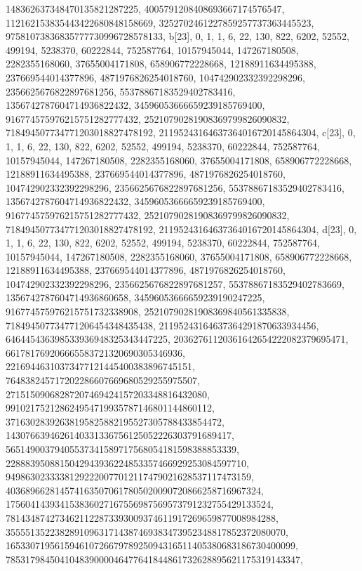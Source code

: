{{{   148362637348470135821287225, 4005791208408693667174576547, 
   112162153835443422680848158669, 3252702461227859257737363445523, 
   97581073836835777730996728578133}}, 
 {b[23], {0, 1, 1, 6, 22, 130, 822, 6202, 52552, 499194, 5238370, 60222844, 
   752587764, 10157945044, 147267180508, 2282355168060, 37655004171808, 
   658906772228668, 12188911634495388, 237669544014377896, 
   4871976826254018760, 104742902332392298296, 2356625676822897681256, 
   55378867183529402783416, 1356742787604714936822432, 
   34596053666659239185769400, 916774575976215751282777432, 
   25210790281908369799826090832, 718494507734771203018827478192, 
   21195243164637364016720145864304}}, 
 {c[23], {0, 1, 1, 6, 22, 130, 822, 6202, 52552, 499194, 5238370, 60222844, 
   752587764, 10157945044, 147267180508, 2282355168060, 37655004171808, 
   658906772228668, 12188911634495388, 237669544014377896, 
   4871976826254018760, 104742902332392298296, 2356625676822897681256, 
   55378867183529402783416, 1356742787604714936822432, 
   34596053666659239185769400, 916774575976215751282777432, 
   25210790281908369799826090832, 718494507734771203018827478192, 
   21195243164637364016720145864304}}, 
 {d[23], {0, 1, 1, 6, 22, 130, 822, 6202, 52552, 499194, 5238370, 60222844, 
   752587764, 10157945044, 147267180508, 2282355168060, 37655004171808, 
   658906772228668, 12188911634495388, 237669544014377896, 
   4871976826254018760, 104742902332392298296, 2356625676822897681257, 
   55378867183529402783669, 1356742787604714936860658, 
   34596053666659239190247225, 916774575976215751732338908, 
   25210790281908369840561335838, 718494507734771206454348435438, 
   21195243164637364291870633934456, 646445436398533936948325343447225, 
   20362761120361642654222082379695471, 661781769206665583721320690305346936, 
   22169446310373477121445400383896745151, 
   764838245717202286607669680529255975507, 
   27151509068287207469424157203348816432080, 
   991021752128624954719935787146801144860112, 
   37163028392638195825882195527305788433854472, 
   1430766394626140331336756125052226303791689417, 
   56514900379405537341589717568054181598388853339, 
   2288839508815042943936224853357466929253084597710, 
   94986302333381292220077012117479021628537117473159, 
   4036896628145741635070617805020090720866258716967324, 
   175604143934153836027167556987569573791232755429133524, 
   7814348742734621122873393009374611917269659877008984288, 
   355551352238289109631714387469383473952348817852372080070, 
   16533071956159461072667978925094316511405380683186730400099, 
   785317984504104839000046477641844861732628895621175319143347, 
}}}
